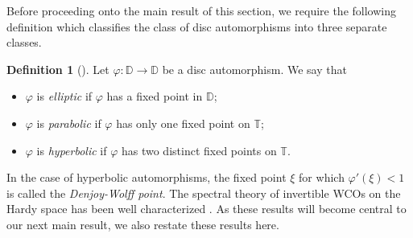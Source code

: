 \documentclass{amsart}
\theoremstyle{definition}
\newtheorem{definition}[thm]{Definition}
\theoremstyle{remark}
\numberwithin{equation}{section}
\begin{document}
Before proceeding onto the main result of this section, we require the following definition which classifies the class of disc automorphisms into three separate classes. 
\begin{definition}[\cite{gunatillake2011invertible}]
    Let $\varphi:\mathbb{D}\to\mathbb{D}$ be a disc automorphism. We say that 
    \begin{itemize}
        \item[1.] $\varphi$ is \textit{elliptic} if $\varphi$ has a fixed point in $\mathbb{D}$;
        \item[2.] $\varphi$ is \textit{parabolic} if $\varphi$ has only one fixed point on $\mathbb{T}$;
        \item[3.] $\varphi$ is \textit{hyperbolic} if $\varphi$ has two distinct fixed points on $\mathbb{T}$. 
    \end{itemize}
\end{definition}
In the case of hyperbolic automorphisms, the fixed point $\xi$ for which $\varphi'(\xi)<1$ is called the \textit{Denjoy-Wolff point}. 
The spectral theory of invertible WCOs on the Hardy space has been well characterized \cite{gunatillake2011invertible}. As these results will become central to our next main result, we also restate these results here. 
\end{document}
